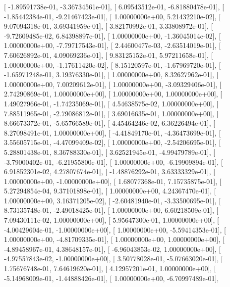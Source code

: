 \documentclass{article}
\begin{document}
       [ -1.89591738e-01,  -3.36734561e-01],
       [  6.09543512e-01,  -6.81880478e-01],
       [ -1.85442384e-01,  -9.21467423e-01],
       [  1.00000000e+00,   5.21432210e-02],
       [  9.07094318e-01,   3.69341959e-01],
       [  3.82170992e-01,   3.33808972e-01],
       [ -9.72609485e-02,   6.84398897e-01],
       [  1.00000000e+00,  -1.36045014e-02],
       [  1.00000000e+00,  -7.79717543e-01],
       [  2.44600477e-03,  -2.63514019e-01],
       [  7.60626892e-01,   4.09069236e-01],
       [  9.83125152e-01,   5.97211658e-01],
       [  1.00000000e+00,  -1.17611420e-02],
       [  8.15120597e-01,  -1.67969720e-01],
       [ -1.65971248e-01,   3.19376330e-01],
       [  1.00000000e+00,   8.32627962e-01],
       [  1.00000000e+00,   7.00209612e-01],
       [  1.00000000e+00,  -3.09329406e-01],
       [  2.74290869e-01,   1.00000000e+00],
       [  1.00000000e+00,   1.00000000e+00],
       [  1.49027966e-01,  -1.74235069e-01],
       [  4.54638575e-02,   1.00000000e+00],
       [  7.88511965e-01,  -2.79086812e-01],
       [  3.69016635e-01,   1.00000000e+00],
       [  8.66673372e-01,  -5.65766589e-01],
       [  4.45464246e-02,   6.36226494e-01],
       [  8.27098491e-01,   1.00000000e+00],
       [ -4.41849170e-01,  -4.36473699e-01],
       [  3.55605715e-01,  -4.47099409e-02],
       [  1.00000000e+00,  -2.54206695e-01],
       [  5.28801438e-01,   8.36788330e-01],
       [  3.62521945e-01,  -4.99479789e-01],
       [ -3.79000402e-01,  -6.21955800e-01],
       [  1.00000000e+00,  -6.19909894e-01],
       [  6.91852301e-02,   4.27807674e-01],
       [ -1.48876292e-01,   3.63333329e-01],
       [  1.00000000e+00,  -1.00000000e+00],
       [  1.68077368e-01,   7.15735875e-01],
       [  5.27294854e-04,   9.37101898e-01],
       [  1.00000000e+00,   4.24367470e-01],
       [  1.00000000e+00,   3.16371205e-02],
       [ -2.60481940e-01,  -3.33500695e-01],
       [  8.73135748e-01,  -2.49018425e-01],
       [  1.00000000e+00,   6.60218509e-01],
       [  7.09430111e-02,   1.00000000e+00],
       [  5.95647300e-01,   1.00000000e+00],
       [ -4.00429604e-01,  -1.00000000e+00],
       [  1.00000000e+00,  -5.59414353e-01],
       [  1.00000000e+00,  -4.81709335e-01],
       [  1.00000000e+00,   1.00000000e+00],
       [ -4.89458967e-01,   4.38648157e-01],
       [ -6.96043853e-02,   1.00000000e+00],
       [ -4.97557843e-02,  -1.00000000e+00],
       [  3.50778028e-01,  -5.07663020e-01],
       [  1.75676748e-01,   7.64619620e-01],
       [  4.12957201e-01,   1.00000000e+00],
       [ -5.14968009e-01,  -1.44888426e-01],
       [  1.00000000e+00,  -6.70997489e-01],
\end{document}
